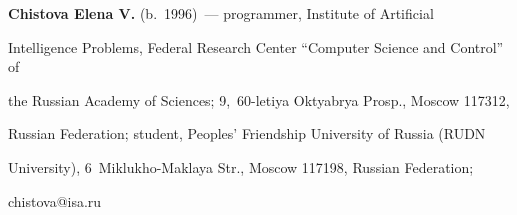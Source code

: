   




  


  \noindent


  \textbf{Chistova Elena V.} (b.\ 1996)~--- programmer, Institute of Artificial 


Intelligence Problems, Federal Research Center ``Computer Science and Control'' of 


the Russian Academy of Sciences; 9,~60-letiya Oktyabrya Prosp., Moscow 117312, 


Russian Federation; student, Peoples' Friendship University of Russia (RUDN 


University), 6~Miklukho-Maklaya Str., Moscow 117198, Russian Federation; 


\mbox{chistova@isa.ru}


\label{end\stat}





\renewcommand{\bibname}{\protect\rm Литература}  


  


